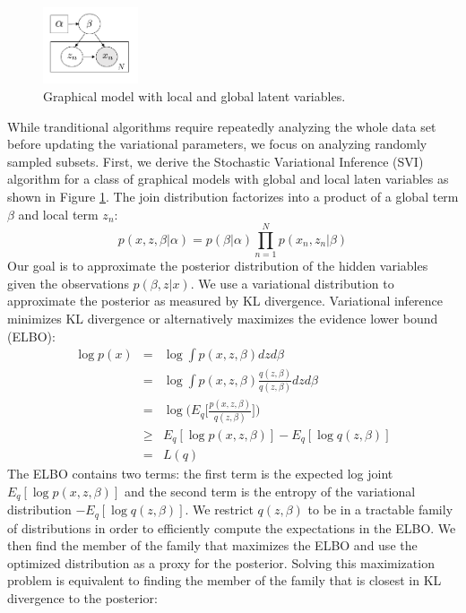 \begin{figure}[tbhp]
    \centering
    \includegraphics[width=0.25\textwidth, trim={10 10 10 10}]{figures/local_global_gm.png}
    \caption{Graphical model with local and global latent variables.}
    \label{fig:svi_gm}
\end{figure}

While tranditional algorithms require repeatedly analyzing the whole data set before updating the variational parameters, we focus on analyzing randomly sampled subsets. First, we derive the Stochastic Variational Inference (SVI) algorithm for a class of graphical models with global and local laten variables as shown in Figure \ref{fig:svi_gm}. The join distribution factorizes into a product of a global term $\beta$ and local term $z_n$:
\begin{equation}
    p(x,z,\beta|\alpha) = p(\beta|\alpha)\prod_{n=1}^{N}p(x_n,z_n|\beta)
\end{equation}
Our goal is to approximate the posterior distribution of the hidden variables given the observations $p(\beta,z|x)$. We use a variational distribution to approximate the posterior as measured by KL divergence. Variational inference minimizes KL divergence or alternatively maximizes the evidence lower bound (ELBO):
\begin{eqnarray}
    \log p(x) &=& \log \int p(x,z,\beta) dz d\beta \\
              &=& \log \int p(x,z,\beta) \frac{q(z,\beta)}{q(z,\beta)} dz d\beta \\
              &=& \log \bigg(E_q \bigg[\frac{p(x,z,\beta)}{q(z,\beta)} \bigg] \bigg) \\
              &\geq& E_q[\log p(x,z,\beta)] - E_q[\log q(z,\beta)]\\
              &=& L(q)
\end{eqnarray}
The ELBO contains two terms: the first term is the expected log joint $E_q[\log p(x,z,\beta)]$ and the second term is the entropy of the variational distribution $- E_q[\log q(z,\beta)]$. We restrict $q(z,\beta)$ to be in a tractable family of distributions in order to efficiently compute the expectations in the ELBO. We then find the member of the family that maximizes the ELBO and use the optimized distribution as a proxy for the posterior. Solving this maximization problem is equivalent to finding the member of the family that is closest in KL divergence to the posterior:
